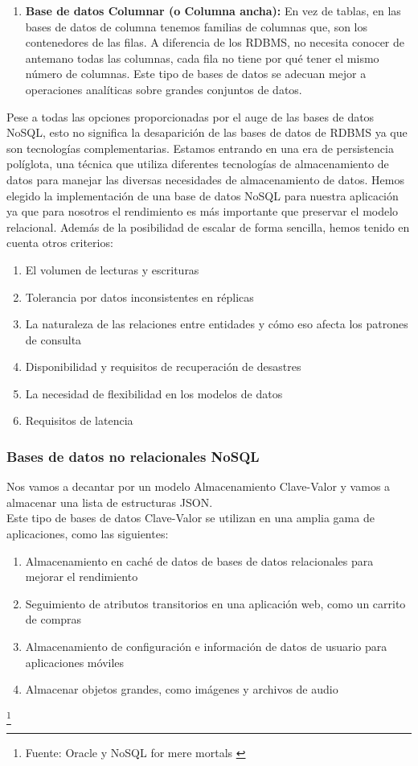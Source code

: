 \begin{enumerate}
\begin{enumerate}
\item \textbf{Base de datos Columnar (o Columna ancha):} En vez de tablas, en las bases de datos de columna tenemos familias de columnas que, son los contenedores de las filas. A diferencia de los RDBMS, no necesita conocer de antemano todas las columnas, cada fila no tiene por qué tener el mismo número de columnas. Este tipo de bases de datos se adecuan mejor a operaciones analíticas sobre grandes conjuntos de datos.
\end{enumerate}

\end{enumerate}
Pese a todas las opciones proporcionadas por el auge de las bases de datos NoSQL, esto no significa la desaparición de las bases de datos de RDBMS ya que son tecnologías complementarias. Estamos entrando en una era de persistencia políglota, una técnica que utiliza diferentes tecnologías de almacenamiento de datos para manejar las diversas necesidades de almacenamiento de datos. Hemos elegido la implementación de una base de datos NoSQL para nuestra aplicación ya que para nosotros el rendimiento es más importante que preservar el modelo relacional. Además de la posibilidad de escalar de forma sencilla, hemos tenido en cuenta otros criterios: 
\begin{enumerate}
\item El volumen de lecturas y escrituras
\item Tolerancia por datos inconsistentes en réplicas
\item La naturaleza de las relaciones entre entidades y cómo eso afecta los patrones de consulta
\item Disponibilidad y requisitos de recuperación de desastres
\item La necesidad de flexibilidad en los modelos de datos
\item Requisitos de latencia
\end{enumerate}
\subsubsection{Bases de datos no relacionales NoSQL}
Nos vamos a decantar por un modelo Almacenamiento Clave-Valor y vamos a almacenar una lista de estructuras JSON.
\\
Este tipo de bases de datos Clave-Valor se utilizan en una amplia gama de aplicaciones, como las siguientes:
\begin{enumerate}
\item Almacenamiento en caché de datos de bases de datos relacionales para mejorar el rendimiento
\item Seguimiento de atributos transitorios en una aplicación web, como un carrito de compras
\item Almacenamiento de configuración e información de datos de usuario para aplicaciones móviles
\item Almacenar objetos grandes, como imágenes y archivos de audio
\end{enumerate}
\footnote{Fuente: Oracle \cite{DEFINICIONNOSQL} y NoSQL for mere mortals \cite{NOSQL}}

